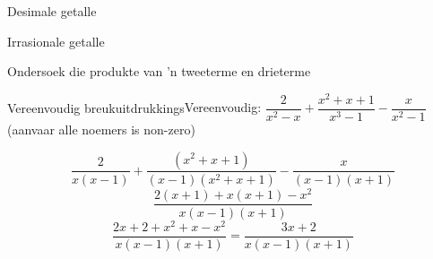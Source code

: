 \begin{Aktiwiteit}{Desimale getalle}
\begin{aktiwiteit}{Irrasionale getalle}
\begin{aktiwiteit}{Ondersoek die produkte van 'n tweeterme en drieterme}
\begin{wex}{Vereenvoudig breukuitdrukkings}{Vereenvoudig: $\dfrac{2}{{x}^{2}-x}+\dfrac{x^{2}+x+1}{x^{3}-1}-\dfrac{x}{{x}^{2}-1}$ 
(aanvaar alle noemers is non-zero)}
{
\begin{equation*}
\dfrac{2}{x(x-1)}+ \dfrac{({x}^{2} + x + 1)}{(x-1)(x^{2}+x+1)}-\dfrac{x}{(x-1)(x+1)}
\end{equation*}
\begin{equation*}
\dfrac{2(x+1)+x(x+1)-x^{2}}{x(x-1)(x+1)}
\end{equation*}
\begin{equation*}
\dfrac{2x+2 + x^{2} + x - x^{2}}{x(x-1)(x+1)} = \dfrac{3x+2}{x(x-1)(x+1)}
\end{equation*}



}
\end{wex}


\begin{exercises}{}
{

}
\end{exercises}
\end{aktiwiteit}
\end{aktiwiteit}
\end{Aktiwiteit}
